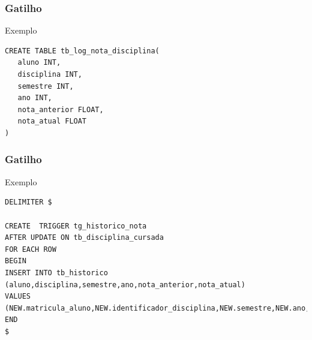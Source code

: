 \documentclass{beamer}
\begin{document}
\begin{frame}[fragile]
\frametitle{Gatilho}

\begin{exampleblock}{Exemplo}
	\begin{lstlisting}
CREATE TABLE tb_log_nota_disciplina(
   aluno INT,
   disciplina INT,
   semestre INT,
   ano INT,
   nota_anterior FLOAT,
   nota_atual FLOAT
)
	\end{lstlisting}
\end{exampleblock}
\end{frame}

\begin{frame}[fragile]
\frametitle{Gatilho}

\begin{exampleblock}{Exemplo}
	\begin{lstlisting}
DELIMITER $

CREATE  TRIGGER tg_historico_nota 
AFTER UPDATE ON tb_disciplina_cursada 
FOR EACH ROW 
BEGIN 
INSERT INTO tb_historico (aluno,disciplina,semestre,ano,nota_anterior,nota_atual) 
VALUES
(NEW.matricula_aluno,NEW.identificador_disciplina,NEW.semestre,NEW.ano,OLD.nota,NEW.nota); 
END
$
	\end{lstlisting}
\end{exampleblock}
\end{frame}
\end{document}
